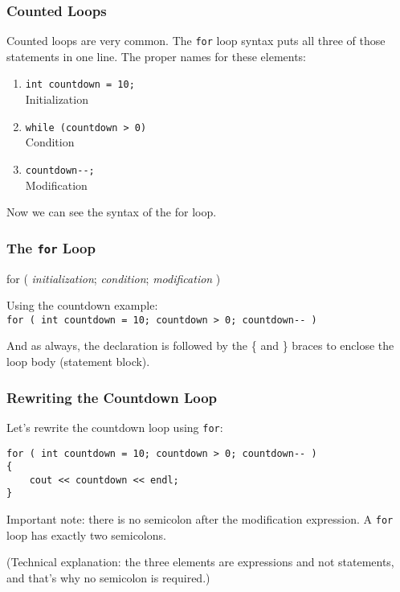 \begin{frame}
\frametitle{Counted Loops}
Counted loops are very common. The \texttt{for} loop syntax puts all three of those statements in one line. The proper names for these elements:

\begin{enumerate}
	\item \texttt{int countdown = 10;}\\
		\quad \alert{Initialization}
	\item \texttt{while (countdown > 0)}\\
		\quad \alert{Condition}
	\item \texttt{countdown{-}{-};}\\
		\quad \alert{Modification}
\end{enumerate}

Now we can see the syntax of the for loop.

\end{frame}

\begin{frame}
\frametitle{The \texttt{for} Loop}

for ( \textit{initialization}; \textit{condition}; \textit{modification} )

Using the countdown example:\\
\quad \texttt{for ( int countdown = 10; countdown > 0; countdown{-}{-} )}

And as always, the declaration is followed by the \{ and \} braces to enclose the loop body (statement block).

\end{frame}

\begin{frame}[fragile]
\frametitle{Rewriting the Countdown Loop}

Let's rewrite the countdown loop using \texttt{for}:

\begin{verbatim}
for ( int countdown = 10; countdown > 0; countdown-- )
{
    cout << countdown << endl;
}
\end{verbatim}

Important note: there is no semicolon after the modification expression. A \texttt{for} loop has exactly two semicolons.

(Technical explanation: the three elements are expressions and not statements, and that's why no semicolon is required.)

\end{frame}


